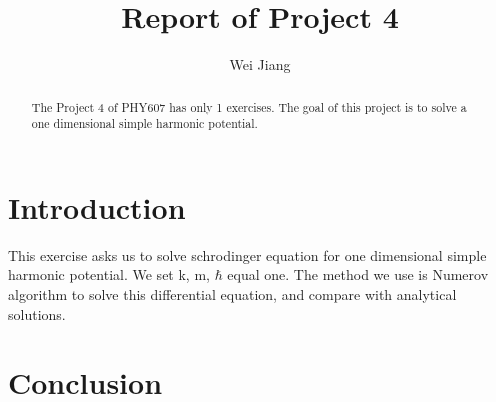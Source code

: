 \documentclass{article}
\begin{document}
\title{Report of Project 4}
\author{Wei Jiang}

\maketitle

\begin{abstract}
The Project 4 of PHY607 has only 1 exercises.
The goal of this project is to solve a one dimensional simple harmonic potential.
\end{abstract}



\section{Introduction}

This exercise asks us to solve schrodinger equation for one dimensional simple harmonic potential. We set k, m, $\hbar$ equal one. The method we use is Numerov algorithm to solve this differential equation, and compare with analytical solutions.


\section{Conclusion}
\end{document}
